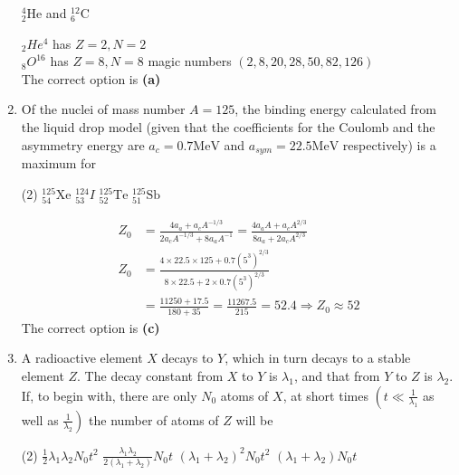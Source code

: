 \begin{enumerate}
\begin{tasks}
	\task[\textbf{D.}]${ }_{2}^{4} \mathrm{He}$ and ${ }_{6}^{12} \mathrm{C}$
\end{tasks}
\begin{answer}
	${ }_{2} H e^{4}$ has $Z=2, N=2$\\
	${ }_{8} O^{16}$ has $Z=8, N=8$ magic numbers $(2,8,20,28,50,82,126)$\\
	The correct option is \textbf{(a)}
\end{answer}
\item Of the nuclei of mass number $A=125$, the binding energy calculated from the liquid drop model (given that the coefficients for the Coulomb and the asymmetry energy are $a_{c}=0.7 \mathrm{MeV}$ and $a_{s y m}=22.5 \mathrm{MeV}$ respectively) is a maximum for
{}
\begin{tasks}(2)
	\task[\textbf{A.}] ${ }_{54}^{125} \mathrm{Xe}$
	\task[\textbf{B.}] ${ }_{53}^{124} I$
	\task[\textbf{C.}]${ }_{52}^{125} \mathrm{Te}$
	\task[\textbf{D.}]${ }_{51}^{125} \mathrm{Sb}$
\end{tasks}
\begin{answer}
	\begin{align*}
	Z_{0}&=\frac{4 a_{a}+a_{c} A^{-1 / 3}}{2 a_{c} A^{-1 / 3}+8 a_{a} A^{-1}}=\frac{4 a_{a} A+a_{c} A^{2 / 3}}{8 a_{a}+2 a_{c} A^{2 / 3}}\\
	Z_{0}&=\frac{4 \times 22.5 \times 125+0.7\left(5^{3}\right)^{2 / 3}}{8 \times 22.5+2 \times 0.7\left(5^{3}\right)^{2 / 3}}\\
	&=\frac{11250+17.5}{180+35}=\frac{11267.5}{215}=52.4 \Rightarrow Z_{0} \approx 52
	\end{align*}
	The correct option is \textbf{(c)}
\end{answer}
\item A radioactive element $X$ decays to $Y$, which in turn decays to a stable element $Z$. The decay constant from $X$ to $Y$ is $\lambda_{1}$, and that from $Y$ to $Z$ is $\lambda_{2}$. If, to begin with, there are only $N_{0}$ atoms of $X$, at short times $\left(t \ll \frac{1}{\lambda_{1}}\right.$ as well as $\left.\frac{1}{\lambda_{2}}\right)$ the number of atoms of $Z$ will be
{}
\begin{tasks}(2)
	\task[\textbf{A.}] $\frac{1}{2} \lambda_{1} \lambda_{2} N_{0} t^{2}$
	\task[\textbf{B.}]$\frac{\lambda_{1} \lambda_{2}}{2\left(\lambda_{1}+\lambda_{2}\right)} N_{0} t$
	\task[\textbf{C.}]$\left(\lambda_{1}+\lambda_{2}\right)^{2} N_{0} t^{2}$
	\task[\textbf{D.}] $\left(\lambda_{1}+\lambda_{2}\right) N_{0} t$
\end{tasks}

\end{enumerate}
